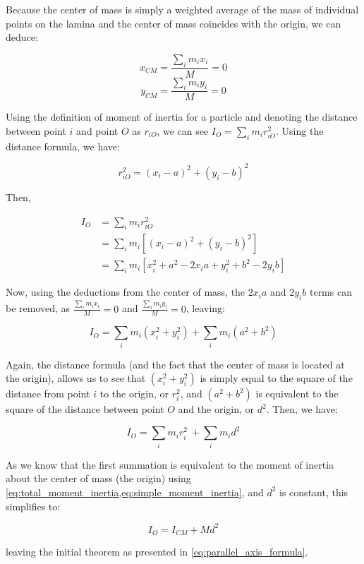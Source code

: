  

Because the center of mass is simply a weighted average of the mass of individual points on the lamina and the center of mass coincides with the origin, we can deduce:

\[x_{CM} = \frac{\sum_i m_ix_i}{M} = 0 \]
\[y_{CM} = \frac{\sum_i m_iy_i}{M} = 0 \]

Using the definition of moment of inertia for a particle and denoting the distance between point $i$ and point $O$ as $r_{iO}$, we can see $I_O = \sum_i m_i r_{iO}^2$. Using the distance formula, we have:

\[r_{iO}^2 = (x_i-a)^2 + (y_i-b)^2\]

Then,

\begin{align*}
I_O &= \sum_i m_i r_{iO}^2 \\
&= \sum_i m_i \left[(x_i-a)^2 + (y_i-b)^2\right] \\
&= \sum_i m_i \left[x_i^2 + a^2 - 2x_ia + y_i^2 + b^2 - 2y_ib\right]
\end{align*}

Now, using the deductions from the center of mass, the $2x_ia$ and $2y_ib$ terms can be removed, as $\frac{\sum_i m_ix_i}{M} = 0$ and $\frac{\sum_i m_iy_i}{M} = 0$, leaving:

\[I_O = \sum_i m_i (x_i^2 + y_i^2) + \sum_i m_i (a^2 + b^2) \]

Again, the distance formula (and the fact that the center of mass is located at the origin), allows us to see that $(x_i^2 + y_i^2)$ is simply equal to the square of the distance from point $i$ to the origin, or $r_i^2$, and $(a^2 + b^2)$ is equivalent to the square of the distance between point $O$ and the origin, or $d^2$. Then, we have:

\[I_O = \sum_i m_i r_i^2\ + \sum_i m_id^2\]

As we know that the first summation is equivalent to the moment of inertia about the center of mass (the origin) using \cref{eq:total_moment_inertia,eq:simple_moment_inertia}, and $d^2$ is constant, this simplifies to:

\[I_O = I_{CM} + Md^2\]

leaving the initial theorem as presented in \cref{eq:parallel_axis_formula}.
